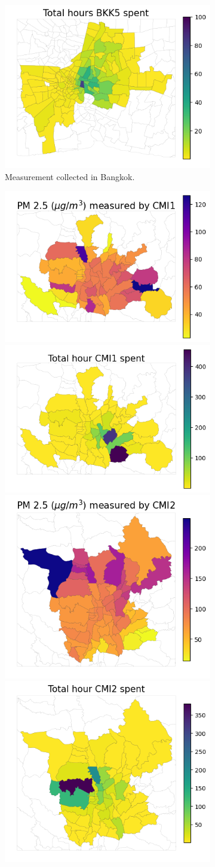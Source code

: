\begin{figure}
\begin{subfigure}[t]{0.49\textwidth}
        \includegraphics[width=.49\linewidth]{figures/map/BKK5_time.png}
        \caption{Measurement collected in Bangkok.}
    \end{subfigure}%
    \hfill%
    \begin{subfigure}[t]{0.49\textwidth}
        \centering
        \includegraphics[width=.49\linewidth]{figures/map/CMI1_PM25.png}%
        \includegraphics[width=.49\linewidth]{figures/map/CMI1_time.png}
        \includegraphics[width=.49\linewidth]{figures/map/CMI2_PM25.png}%
        \includegraphics[width=.49\linewidth]{figures/map/CMI2_time.png}

\end{subfigure}
\end{figure}
